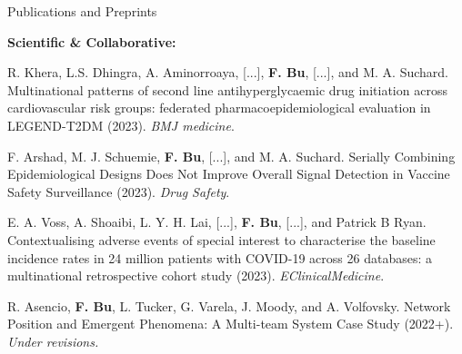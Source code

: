 \documentclass{resume} %
\begin{document}
\begin{rSection}{Publications and Preprints}
\medskip

\hspace{-.2in} \textbf{Scientific \& Collaborative:}

R. Khera, L.S. Dhingra, A. Aminorroaya, [...], \textbf{F. Bu}, [...], and  M. A. Suchard.  Multinational patterns of second line antihyperglycaemic drug initiation across cardiovascular risk groups: federated pharmacoepidemiological evaluation in LEGEND-T2DM (2023). \emph{BMJ medicine}. 

\smallskip

F. Arshad, M. J. Schuemie, \textbf{F. Bu}, [...], and M. A. Suchard. Serially Combining Epidemiological Designs Does Not Improve Overall Signal Detection in Vaccine Safety Surveillance (2023). \emph{Drug Safety}. 

\smallskip

E. A. Voss, A. Shoaibi, L. Y. H. Lai,  [...], \textbf{F. Bu}, [...], and Patrick B Ryan. Contextualising adverse events of special interest to characterise the baseline incidence rates in 24 million patients with COVID-19 across 26 databases: a multinational retrospective cohort study (2023). \emph{EClinicalMedicine}. 


\smallskip

R. Asencio, \textbf{F. Bu}, L. Tucker, G. Varela, J. Moody, and A. Volfovsky. 
Network Position and Emergent Phenomena: A Multi-team System Case Study (2022+). \emph{Under revisions.}




\end{rSection}




%

\end{document}
